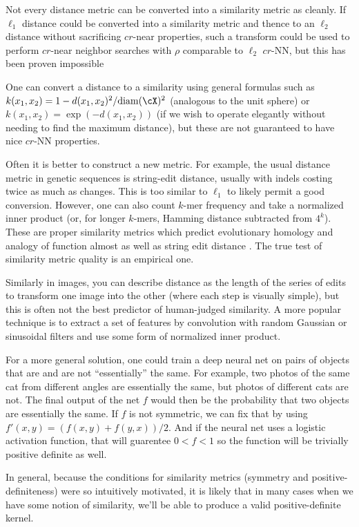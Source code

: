 \documentclass[twoside,11pt]{homework}
\begin{document}
\begin{multicols}{2}
Not every distance metric can be converted into a similarity metric as
cleanly.  If $\ell_1$ distance could be converted into a similarity
metric and thence to an $\ell_2$ distance without sacrificing $cr$-near
properties, such a transform could be used to perform $cr$-near neighbor
searches with $\rho$ comparable to $\ell_2$ $cr$-NN, but this has been
proven impossible \cite{OWZ2009}

One can convert a distance to a similarity using general formulas such
as $k(x_1,x_2)=1-d(x_1,x_2)^2/\mathrm{diam}(\cX)^2$ (analogous to the unit sphere) or
$k(x_1,x_2)=\exp(-d(x_1,x_2))$ (if we wish to operate elegantly without
needing to find the maximum distance), but these are not guaranteed to
have nice $cr$-NN properties.

Often it is better to construct a new metric.  For example, the usual
distance metric in genetic sequences is string-edit distance, usually
with indels costing twice as much as changes.  This is too similar to
$\ell_1$ to likely permit a good conversion.  However, one can also
count $k$-mer frequency and take a normalized inner product (or, for
longer $k$-mers, Hamming distance subtracted from $4^k$).  These are
proper similarity metrics which predict evolutionary homology and
analogy of function almost as well as string edit distance \cite{MWS+2012}.
The true test of similarity metric quality is an empirical
one.

Similarly in images, you can describe distance as the length of the
series of edits to transform one image into the other (where each step
is visually simple), but this is often not the best predictor of
human-judged similarity.  A more popular technique is to extract a set
of features by convolution with random Gaussian or sinusoidal filters
and use some form of normalized inner product. \cite{ZBMM2006}

For a more general solution, one could train a deep neural net on
pairs of objects that are and are not ``essentially'' the same.  For
example, two photos of the same cat from different angles are
essentially the same, but photos of different cats are not.  The final
output of the net $f$ would then be the probability that two objects are
essentially the same.   If $f$ is not symmetric, we can fix that by using
$f'(x,y)=(f(x,y)+f(y,x))/2$.  And if the neural net uses a logistic activation
function, that will guarentee $0<f<1$ so the function will be
trivially positive definite as well.

In general, because the conditions for similarity metrics (symmetry
and positive-definiteness)  were so intuitively motivated, it is
likely that in many cases when we have some notion of similarity,
we'll be able to produce a valid positive-definite kernel.


\end{multicols}
\end{document}

